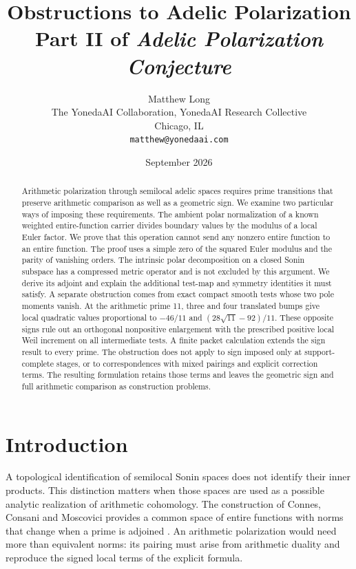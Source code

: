 \documentclass[11pt,letterpaper]{article}
\title{Obstructions to Adelic Polarization\\[4pt]
{\normalsize Part II of \emph{Adelic Polarization Conjecture}}}
\author{Matthew Long\\
\small The YonedaAI Collaboration, YonedaAI Research Collective\\
\small Chicago, IL\\
\small\texttt{matthew@yonedaai.com}}
\date{September 2026}
\theoremstyle{definition}
\theoremstyle{remark}
\begin{document}
\maketitle
\begin{abstract}
Arithmetic polarization through semilocal adelic spaces requires prime transitions that preserve arithmetic comparison as well as a geometric sign. We examine two particular ways of imposing these requirements. The ambient polar normalization of a known weighted entire-function carrier divides boundary values by the modulus of a local Euler factor. We prove that this operation cannot send any nonzero entire function to an entire function. The proof uses a simple zero of the squared Euler modulus and the parity of vanishing orders. The intrinsic polar decomposition on a closed Sonin subspace has a compressed metric operator and is not excluded by this argument. We derive its adjoint and explain the additional test-map and symmetry identities it must satisfy. A separate obstruction comes from exact compact smooth tests whose two pole moments vanish. At the arithmetic prime 11, three and four translated bumps give local quadratic values proportional to $-46/11$ and $(28\sqrt{11}-92)/11$. These opposite signs rule out an orthogonal nonpositive enlargement with the prescribed positive local Weil increment on all intermediate tests. A finite packet calculation extends the sign result to every prime. The obstruction does not apply to sign imposed only at support-complete stages, or to correspondences with mixed pairings and explicit correction terms. The resulting formulation retains those terms and leaves the geometric sign and full arithmetic comparison as construction problems.
\end{abstract}

\section{Introduction}
\label{sec:introduction}

A topological identification of semilocal Sonin spaces does not identify
their inner products. This distinction matters when those spaces are used
as a possible analytic realization of arithmetic cohomology. The
construction of Connes, Consani and Moscovici provides a common space of
entire functions with norms that change when a prime is adjoined
\cite[Sections 4.7 and 4.8]{CCM24}. An arithmetic polarization would need
more than equivalent norms: its pairing must arise from arithmetic
duality and reproduce the signed local terms of the explicit formula.
\end{document}
